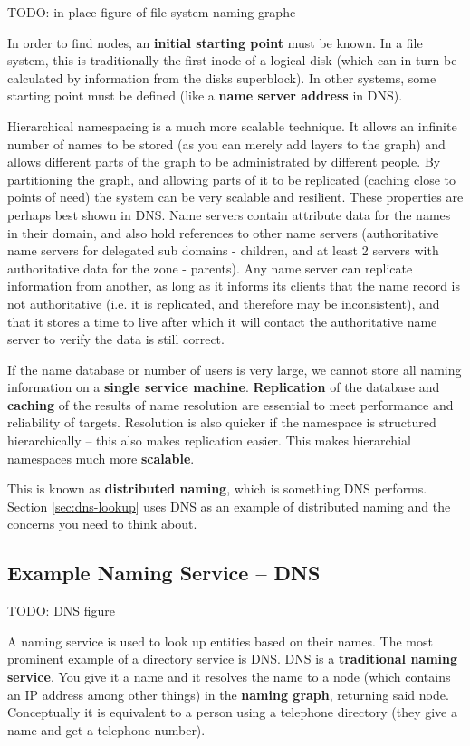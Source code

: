 \documentclass{article}
\begin{document}
TODO: in-place figure of file system naming graphc

In order to find nodes, an \textbf{initial starting point} must be known. In a file system, this is traditionally the first inode of a logical disk (which can in turn be calculated by information from the disks superblock). In other systems, some starting point must be defined (like a \textbf{name server address} in DNS).

Hierarchical namespacing is a much more scalable technique. It allows an infinite number of names to be stored (as you can merely add layers to the graph) and allows different parts of the graph to be administrated by different people. By partitioning the graph, and allowing parts of it to be replicated (caching close to points of need) the system can be very scalable and resilient. These properties are perhaps best shown in DNS. Name servers contain attribute data for the names in their domain, and also hold references to other name servers (authoritative name servers for delegated sub domains - children, and at least 2 servers with authoritative data for the zone - parents). Any name server can replicate information from another, as long as it informs its clients that the name record is not authoritative (i.e. it is replicated, and therefore may be inconsistent), and that it stores a time to live after which it will contact the authoritative name server to verify the data is still correct. 

If the name database or number of users is very large, we cannot store all naming information on a \textbf{single service machine}. \textbf{Replication} of the database and \textbf{caching} of the results of name resolution are essential to meet performance and reliability of targets. Resolution is also quicker if the namespace is structured hierarchically -- this also makes replication easier. This makes hierarchial namespaces much more \textbf{scalable}.

This is known as \textbf{distributed naming}, which is something DNS performs. Section \ref{sec:dns-lookup} uses DNS as an example of distributed naming and the concerns you need to think about.

\subsection{Example Naming Service -- DNS}

TODO: DNS figure

A naming service is used to look up entities based on their names. The most prominent example of a directory service is DNS. DNS is a \textbf{traditional naming service}. You give it a name and it resolves the name to a node (which contains an IP address among other things) in the \textbf{naming graph}, returning said node. Conceptually it is equivalent to a person using a telephone directory (they give a name and get a telephone number).
\end{document}
